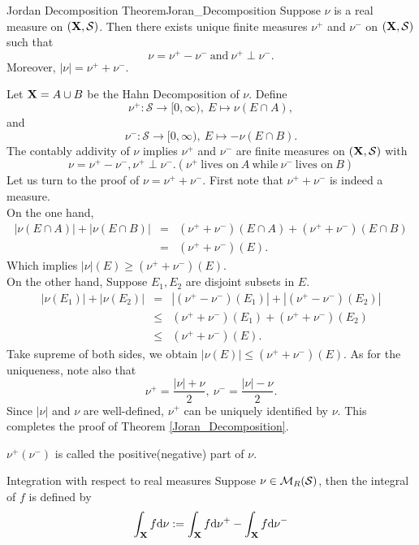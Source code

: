 \begin{stheorem}{Jordan Decomposition Theorem}{Joran_Decomposition}
Suppose $\nu$ is a real measure on $(\mathbf{X},\mathcal S)$. Then there exists unique finite measures $\nu^+$ and $\nu^-$ on $(\mathbf{X},\mathcal S)$ such that 
$$
\nu = \nu^+ - \nu^- \ \text{and} \ \nu^+ \perp \nu^-.
$$
Moreover, $|\nu|= \nu^+ + \nu^-$.
\end{stheorem}
\begin{Proof}
Let $\mathbf{X}=A\cup B$ be the Hahn Decomposition of $\nu$. Define
$$
\nu^+: \mathcal S \to [0,\infty),\ E \mapsto \nu(E\cap A),
$$
and 
$$
\nu^-: \mathcal S \to [0,\infty), \ E \mapsto -\nu(E\cap B).
$$
The contably addivity of $\nu$ implies $\nu^+$ and $\nu^-$ are finite measures on $(\mathbf{X},\mathcal S)$ with 
$$
\nu = \nu^+ - \nu^-, \nu^+ \perp \nu^-. (\nu^+ \ \text{lives on}\  A \ \text{while} \ \nu^- \ \text{lives on}\  B)
$$
Let us turn to the proof of $\nu = \nu^+ + \nu^-$. First note that $\nu^+ + \nu^- $ is indeed a measure.\\
On the one hand, 
\begin{eqnarray*}
|\nu(E\cap A)| + |\nu(E\cap B)| &=& (\nu^+ + \nu^-)(E\cap A) + (\nu^+ + \nu^-)(E \cap B) \\
&=& (\nu^+ + \nu^-)(E).
\end{eqnarray*}
Which implies $|\nu|(E) \geq (\nu^+ +\nu^-)(E)$. \\
On the other hand, Suppose $E_1, E_2$ are disjoint subsets in $E$.
\begin{eqnarray*}
	|\nu(E_1)| + |\nu(E_2)| &=& |(\nu^+ - \nu^-)(E_1)| + |(\nu^+ - \nu^-)(E_2)| \\
	&\leq &  (\nu^+ + \nu^ -)(E_1) + (\nu^+ + \nu^ -)(E_2) \\
	&\leq & (\nu^+ + \nu^ -)(E).
\end{eqnarray*}
Take supreme of both sides, we obtain $|\nu(E)|\leq (\nu^+ + \nu^ -)(E)$.
As for the uniqueness, note also that
$$
\nu^+ = \frac{|\nu|+\nu}{2}, \ \nu^- = \frac{|\nu|-\nu}{2}.
$$
Since $|\nu|$ and $\nu$ are well-defined, $\nu^+$ can be uniquely identified by $\nu$.  This completes the proof of Theorem \ref{Joran_Decomposition}.
\end{Proof}

\begin{sremark}{}{}
 $\nu^+(\nu^-)$ is called the positive(negative) part of $\nu$.
\end{sremark}

\begin{sdefinition}{Integration with respect to real measures}{}
Suppose $\nu \in \mathcal{M}_R(\mathcal S)$, then the integral of $f$ is defined by
$$
\int_{\mathbf{X}} f \mathrm{d} \nu := \int_{\mathbf{X}} f \mathrm{d} \nu^+ - \int_{\mathbf{X}} f \mathrm{d} \nu^-
$$
\end{sdefinition}





